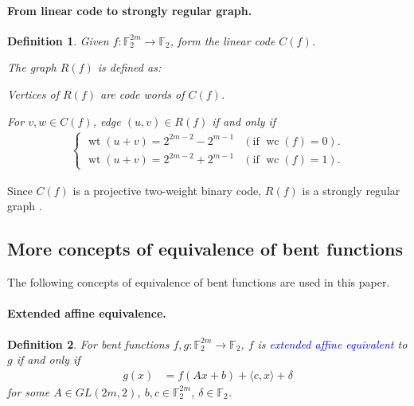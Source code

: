 \documentclass[12pt,a4paper]{article}
\newcommand{\mb}[1]{\mathbb{#1}}
\newcommand{\F}{\mb{F}}
\newcommand{\To}{\rightarrow}
\newcommand{\Emph}[1]{\emph{\textcolor{blue}{#1}}}
\newcommand{\weight}[1]{\operatorname{wt}\left(#1\right)}
\newcommand{\weightclass}[1]{\operatorname{wc}\left(#1\right)}
\newtheorem{Definition}{Definition}
\begin{document}
\paragraph*{From linear code to strongly regular graph.}
\begin{Definition}
\label{R-f-def}
Given $f : \F_2^{2m} \To \F_2$, form the linear code $C(f)$.

The graph $R(f)$ is defined as:

Vertices of $R(f)$ are code words of $C(f)$.

For $v,w \in C(f)$, edge $(u,v) \in R(f)$ if and only if
\begin{align*}
\begin{cases}
\weight{u+v} = 2^{2m-2} - 2^{m-1} & (\text{if~}\weightclass{f}=0).
\\
\weight{u+v} = 2^{2m-2} + 2^{m-1} & (\text{if~}\weightclass{f}=1).
\end{cases}
\end{align*}

\end{Definition}
Since $C(f)$ is a projective two-weight binary code,
$R(f)$ is a strongly regular graph \cite[Theorem 2]{Del72weights}.


\subsection{More concepts of equivalence of bent functions}
The following concepts of equivalence of bent functions are used in this paper.

\paragraph*{Extended affine equivalence.}

\begin{Definition}
For bent functions $f,g : \F_2^{2m} \To \F_2$,
$f$ is \Emph{extended affine equivalent} \cite[Section 1.4]{Tok15bent} to $g$ if and only if
\begin{align*}
g(x) &= f(A x + b) + \langle c, x \rangle + \delta
\end{align*}
for some $A \in GL(2m,2)$, $b, c \in \F_2^{2m}$, $\delta \in \F_2$.
\end{Definition}
\end{document}
